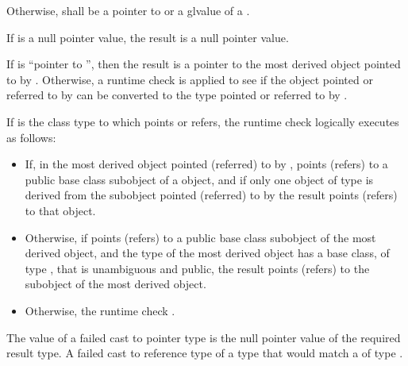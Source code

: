 \pnum
Otherwise,  shall be a pointer to or a glvalue of a
.

\pnum
If  is a null pointer value, the result is a null pointer value.

\pnum
If  is ``pointer to \cv{} '', then the result
is a pointer to the most derived object pointed to by .
Otherwise, a runtime check is applied to see if the object pointed or
referred to by  can be converted to the type pointed or
referred to by .

\pnum
If  is the class type to which  points or refers, the runtime
check logically executes as follows:
\begin{itemize}
\item If, in the most derived object pointed (referred) to by ,
 points (refers) to a public base class subobject of a
 object, and if only one object of type  is derived
from the subobject pointed (referred) to by  the result points (refers) to that  object.

\item Otherwise, if  points (refers) to a public base
class subobject of the most derived object, and the type of the most
derived object has a base class, of type , that is unambiguous
and public, the result points (refers) to the
 subobject of the most derived object.

\item Otherwise, the
runtime check .
\end{itemize}

\pnum
The value of a failed cast to pointer type is the null pointer value of
the required result type. A failed cast to reference type  of a type that would match a
 of type .

